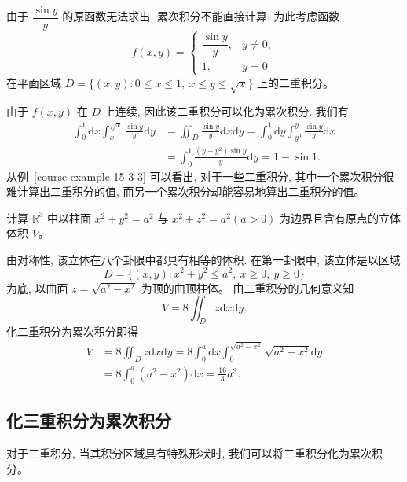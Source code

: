 \documentclass[UTF8,12pt,a4paper,fontset=fandol]{ctexart}
\begin{document}
\begin{solve}\quad 由于 $\dfrac{\sin y}{y}$ 的原函数无法求出, 累次积分不能直接计算. 为此考虑函数
\[
  f(x,y)=
  \begin{cases}
    \dfrac{\sin y}{y}, & y\ne0,\\
    1, & y=0
  \end{cases}
\]
在平面区域 $D=\{(x,y):0\leqslant x\leqslant1,\ x\leqslant y\leqslant\sqrt x\}$ 上的二重积分。

由于 $f(x,y)$ 在 $D$ 上连续, 因此该二重积分可以化为累次积分. 我们有
\[
\begin{aligned}
  \int_0^1\mathrm dx\int_x^{\sqrt x}\frac{\sin y}{y}\mathrm dy
  &=\iint_D\frac{\sin y}{y}\mathrm dx\mathrm dy
    =\int_0^1\mathrm dy\int_{y^2}^{y}\frac{\sin y}{y}\mathrm dx\\
  &=\int_0^1\frac{(y-y^2)\sin y}{y}\mathrm dy
    =1-\sin1.
\end{aligned}
\]
从例~\ref{course-example-15-3-3}  可以看出, 对于一些二重积分, 其中一个累次积分很难计算出二重积分的值, 而另一个累次积分却能容易地算出二重积分的值。

\end{solve}
\begin{example}\label{course-example-15-3-4}\quad 计算 $\mathbb R^3$ 中以柱面 $x^2+y^2=a^2$ 与 $x^2+z^2=a^2(a>0)$ 为边界且含有原点的立体体积 $V$。

\end{example}
\begin{solve}\quad 由对称性, 该立体在八个卦限中都具有相等的体积. 在第一卦限中, 该立体是以区域
\[
  D=\{(x,y):x^2+y^2\leqslant a^2,\ x\geqslant0,\ y\geqslant0\}
\]
为底, 以曲面 $z=\sqrt{a^2-x^2}$ 为顶的曲顶柱体。
由二重积分的几何意义知
\[
  V=8\iint_D z\mathrm dx\mathrm dy.
\]
化二重积分为累次积分即得
\[
\begin{aligned}
  V
  &=8\iint_D z\mathrm dx\mathrm dy
    =8\int_0^a\mathrm dx\int_0^{\sqrt{a^2-x^2}}\sqrt{a^2-x^2}\mathrm dy\\
  &=8\int_0^a(a^2-x^2)\mathrm dx
    =\frac{16}{3}a^3.
\end{aligned}
\]

\end{solve}
\subsection{化三重积分为累次积分}

对于三重积分, 当其积分区域具有特殊形状时, 我们可以将三重积分化为累次积分。
\end{document}
